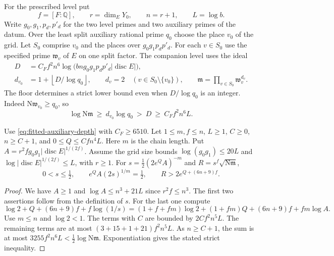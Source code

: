 For the prescribed level put
\[
 f=[F:\mathbb Q],\qquad r=\dim_EY_0,\qquad n=r+1,
 \qquad L=\log b.
\]
Write \(g_0,g_1,p_d,p'_d\) for the two level primes
and two auxiliary primes of the datum. Over the least split auxiliary
rational prime \(q_0\) choose the place \(v_0\) of the grid. Let
\(S_0\) comprise \(v_0\) and the places over \(g_0g_1p_dp'_d\).
For each \(v\in S_0\) use the specified prime \(\mathfrak w_v\) of
\(E\) on one split factor. The companion level uses the ideal
\begin{equation}\label{eq:fitted-auxiliary-depth}
 \begin{split}
 D&=C_F f^2 n^6\log\!\bigl(b n g_0g_1p_dp'_d|\operatorname{disc}E|\bigr),\\
 d_{v_0}&=1+\left\lfloor D/\log q_0\right\rfloor,\qquad
 d_v=2\quad(v\in S_0\setminus\{v_0\}),\qquad
 \mathfrak m=\prod_{v\in S_0}\mathfrak w_v^{d_v} .
 \end{split}
\end{equation}
The floor determines a strict lower bound even when \(D/\log q_0\)
is an integer. Indeed \(\mathrm N\mathfrak w_{v_0}\ge q_0\), so
\[
 \log\mathrm N\mathfrak m\ \ge\ d_{v_0}\log q_0
           \ >\ D\ \ge\ C_F f^2 n^6 L .
\]

\begin{auxlemma}\label{lem:fitted-depth-allowance}
Use \eqref{eq:fitted-auxiliary-depth} with \(C_F\ge6510\). Let
\(1\le m,f\le n\), \(L\ge1\), \(C\ge0\), \(n\ge C+1\), and
\(0\le Q\le C f n^4L\). Here \(m\) is the chain length. Put
\(A=r^2 f g_0g_1|\operatorname{disc}E|^{1/(2f)}\).
Assume the grid size bounds \(\log(g_0g_1)\le20L\) and
\(\log|\operatorname{disc}E|^{1/(2f)}\le L\), with \(r\ge1\).
For \(s=\tfrac12(2e^Q A)^{-m}\) and
\(R=s^f\sqrt{\mathrm N\mathfrak m}\),
\[
 0<s\le\tfrac12,\qquad e^Q A(2s)^{1/m}=\tfrac12,\qquad
 R>2e^{Q+(6n+9)f} .
\]
\end{auxlemma}
\begin{proof}
We have \(A\ge1\) and \(\log A\le n^3+21L\) since \(r^2 f\le n^3\).
The first two assertions follow from the definition of \(s\). For the
last one compute
\[
 \log 2+Q+(6n+9)f+f\log(1/s)
 = (1+f+fm)\log 2+(1+fm)Q+(6n+9)f+fm\log A .
\]
Use \(m\le n\) and \(\log 2<1\). The terms with \(C\) are bounded by
\(2C f^2 n^5 L\). The remaining terms are at most
\((3+15+1+21)f^2 n^5 L\). As \(n\ge C+1\), the sum is at most
\(3255 f^2 n^6 L < \tfrac12\log\mathrm N\mathfrak m\).
Exponentiation gives the stated strict inequality.
\end{proof}

